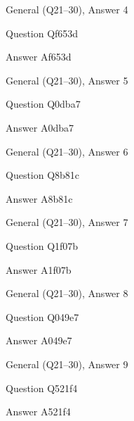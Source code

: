 \documentclass[11pt]{beamer}
\begin{document}
\begin{frame}[t]{General (Q21--30), Answer 4}
\vspace{2em}
\begin{block}{Question}
Qf653d
\end{block}
\pause{}
\begin{block}{Answer}
Af653d
\end{block}
\end{frame}
    

\begin{frame}[t]{General (Q21--30), Answer 5}
\vspace{2em}
\begin{block}{Question}
Q0dba7
\end{block}
\pause{}
\begin{block}{Answer}
A0dba7
\end{block}
\end{frame}
    

\begin{frame}[t]{General (Q21--30), Answer 6}
\vspace{2em}
\begin{block}{Question}
Q8b81c
\end{block}
\pause{}
\begin{block}{Answer}
A8b81c
\end{block}
\end{frame}
    

\begin{frame}[t]{General (Q21--30), Answer 7}
\vspace{2em}
\begin{block}{Question}
Q1f07b
\end{block}
\pause{}
\begin{block}{Answer}
A1f07b
\end{block}
\end{frame}
    

\begin{frame}[t]{General (Q21--30), Answer 8}
\vspace{2em}
\begin{block}{Question}
Q049e7
\end{block}
\pause{}
\begin{block}{Answer}
A049e7
\end{block}
\end{frame}
    

\begin{frame}[t]{General (Q21--30), Answer 9}
\vspace{2em}
\begin{block}{Question}
Q521f4
\end{block}
\pause{}
\begin{block}{Answer}
A521f4
\end{block}
\end{frame}
    
\end{document}
